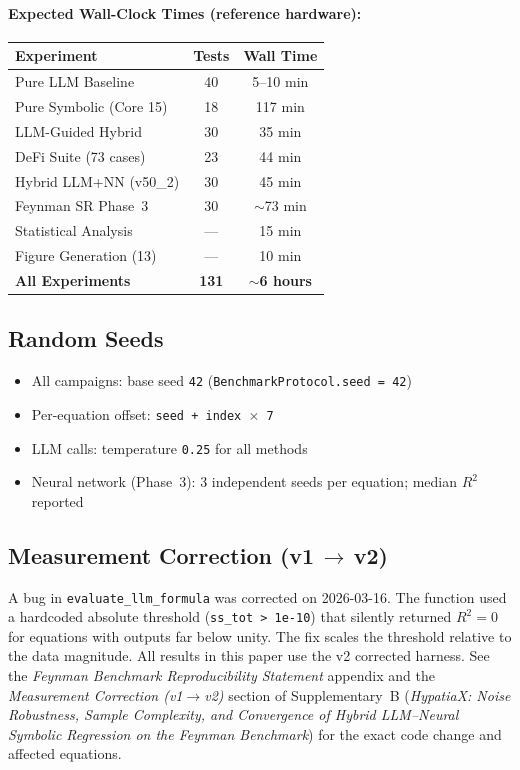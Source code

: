 \documentclass[twoside,11pt]{article}
\begin{document}
\paragraph{Expected Wall-Clock Times (reference hardware):}
\begin{small}
\begin{tabular}{@{}lcc@{}}
\toprule
\textbf{Experiment} & \textbf{Tests} & \textbf{Wall Time} \\
\midrule
Pure LLM Baseline          & 40  & 5--10 min \\
Pure Symbolic (Core 15)    & 18  & 117 min \\
LLM-Guided Hybrid          & 30  & 35 min \\
DeFi Suite (73 cases)      & 23  & 44 min \\
Hybrid LLM+NN (v50\_2)     & 30  & 45 min \\
Feynman SR Phase~3         & 30  & $\sim$73 min \\
Statistical Analysis       & --- & 15 min \\
Figure Generation (13)     & --- & 10 min \\
\midrule
\textbf{All Experiments}   & \textbf{131} & \textbf{$\sim$6 hours} \\
\bottomrule
\end{tabular}
\end{small}

\subsection{Random Seeds}

\begin{itemize}
\item All campaigns: base seed \texttt{42} (\texttt{BenchmarkProtocol.seed = 42})
\item Per-equation offset: \texttt{seed + index $\times$ 7}
\item LLM calls: temperature \texttt{0.25} for all methods
\item Neural network (Phase~3): 3 independent seeds per equation; median $R^2$ reported
\end{itemize}

\subsection{Measurement Correction (v1\,$\to$\,v2)}

A bug in \texttt{evaluate\_llm\_formula} was corrected on 2026-03-16.
The function used a hardcoded absolute threshold (\texttt{ss\_tot > 1e-10})
that silently returned $R^2=0$ for equations with outputs far below unity.
The fix scales the threshold relative to the data magnitude.
All results in this paper use the v2 corrected harness.
See the \emph{Feynman Benchmark Reproducibility Statement} appendix and the
\emph{Measurement Correction (v1$\to$v2)} section of Supplementary~B
(\emph{HypatiaX: Noise Robustness, Sample Complexity, and Convergence of
Hybrid LLM--Neural Symbolic Regression on the Feynman Benchmark}) for the
exact code change and affected equations.
\end{document}
